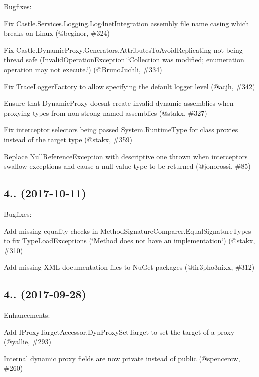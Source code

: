Bugfixes\+:
\begin{DoxyItemize}
\item Fix Castle.\+Services.\+Logging.\+Log4net\+Integration assembly file name casing which breaks on Linux (@beginor, \#324)
\item Fix Castle.\+Dynamic\+Proxy.\+Generators.\+Attributes\+To\+Avoid\+Replicating not being thread safe (Invalid\+Operation\+Exception \char`\"{}\+Collection was modified; enumeration operation may not execute.\char`\"{}) (@\+Bruno\+Juchli, \#334)
\item Fix Trace\+Logger\+Factory to allow specifying the default logger level (@acjh, \#342)
\item Ensure that Dynamic\+Proxy doesn\textquotesingle{}t create invalid dynamic assemblies when proxying types from non-\/strong-\/named assemblies (@stakx, \#327)
\item Fix interceptor selectors being passed {\ttfamily System.\+Runtime\+Type} for class proxies instead of the target type (@stakx, \#359)
\item Replace Null\+Reference\+Exception with descriptive one thrown when interceptors swallow exceptions and cause a null value type to be returned (@jonorossi, \#85)
\end{DoxyItemize}

\subsection*{4.. (2017-\/10-\/11)}

Bugfixes\+:
\begin{DoxyItemize}
\item Add missing equality checks in {\ttfamily Method\+Signature\+Comparer.\+Equal\+Signature\+Types} to fix {\ttfamily Type\+Load\+Exception}s (\char`\"{}\+Method does not have an implementation\char`\"{}) (@stakx, \#310)
\item Add missing X\+ML documentation files to Nu\+Get packages (@fir3pho3nixx, \#312)
\end{DoxyItemize}

\subsection*{4.. (2017-\/09-\/28)}

Enhancements\+:
\begin{DoxyItemize}
\item Add I\+Proxy\+Target\+Accessor.\+Dyn\+Proxy\+Set\+Target to set the target of a proxy (@yallie, \#293)
\item Internal dynamic proxy fields are now private instead of public (@spencercw, \#260)
\end{DoxyItemize}

